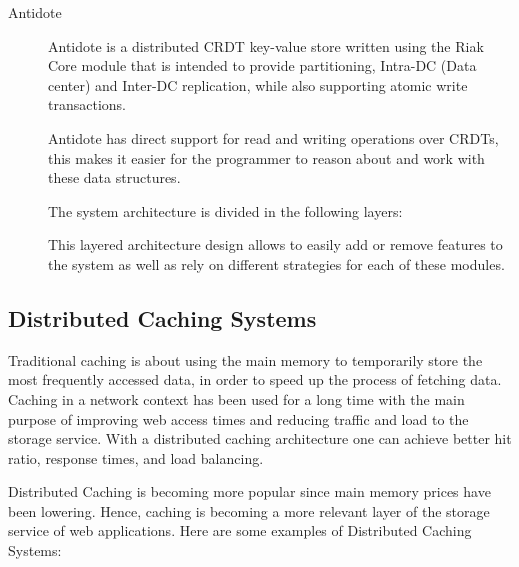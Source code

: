 \begin{description}
\item[Antidote]\cite{site_antidote} Antidote is a distributed CRDT key-value store written using the Riak Core module that is intended to provide partitioning, Intra-DC (Data center) and Inter-DC replication, while also supporting atomic write transactions.\par
	Antidote has direct support for read and writing operations over CRDTs, this makes it easier for the programmer to reason about and work with these data structures.\par
	The system architecture is divided in the following layers: 
\par
	This layered architecture design allows to easily add or remove features to the system as well as rely on different strategies for each of these modules.

\end{description}

\subsection{Distributed Caching Systems}
\label{sec:distributed_caching_systems}
Traditional caching is about using the main memory to temporarily store the most frequently accessed data, in order to speed up the process of fetching data. Caching in a network context has been used for a long time with the main purpose of improving web access times and reducing traffic and load to the storage service. With a distributed caching architecture one can achieve better hit ratio, response times, and load balancing\cite{distributed_caching}.\par
	Distributed Caching is becoming more popular since main memory prices have been lowering. Hence, caching is becoming a more relevant layer of the storage service of web applications. Here are some examples of Distributed Caching Systems:
	
